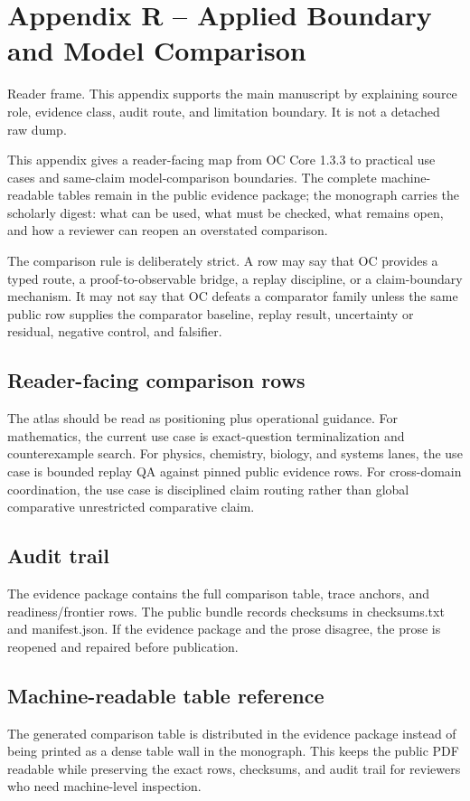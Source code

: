 \section{Appendix R -- Applied Boundary and Model Comparison}
Reader frame. This appendix supports the main manuscript by explaining source role, evidence class, audit route, and limitation boundary. It is not a detached raw dump.


\label{sec:oc-core-1-3-practical-utility-atlas}

This appendix gives a reader-facing map from OC Core 1.3.3 to practical use cases and same-claim model-comparison boundaries. The complete machine-readable tables remain in the public evidence package; the monograph carries the scholarly digest: what can be used, what must be checked, what remains open, and how a reviewer can reopen an overstated comparison.


The comparison rule is deliberately strict. A row may say that OC provides a typed route, a proof-to-observable bridge, a replay discipline, or a claim-boundary mechanism. It may not say that OC defeats a comparator family unless the same public row supplies the comparator baseline, replay result, uncertainty or residual, negative control, and falsifier.


\subsection{Reader-facing comparison rows}

The atlas should be read as positioning plus operational guidance. For mathematics, the current use case is exact-question terminalization and counterexample search. For physics, chemistry, biology, and systems lanes, the use case is bounded replay QA against pinned public evidence rows. For cross-domain coordination, the use case is disciplined claim routing rather than global comparative unrestricted comparative claim.


\subsection{Audit trail}

The evidence package contains the full comparison table, trace anchors, and readiness/frontier rows. The public bundle records checksums in checksums.txt and manifest.json. If the evidence package and the prose disagree, the prose is reopened and repaired before publication.


\subsection{Machine-readable table reference}

The generated comparison table is distributed in the evidence package instead of being printed as a dense table wall in the monograph. This keeps the public PDF readable while preserving the exact rows, checksums, and audit trail for reviewers who need machine-level inspection.
